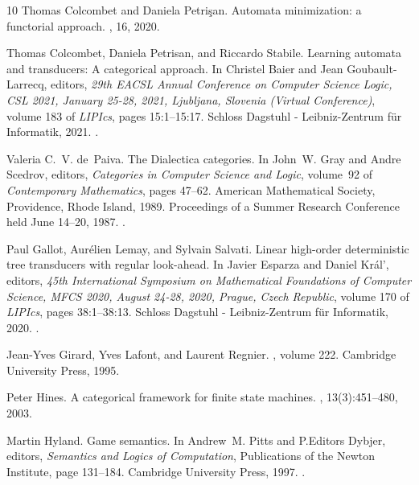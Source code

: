 \documentclass[10pt,a4paper]{amsart}
\numberwithin{equation}{section}
\theoremstyle{plain}
\begin{document}
\begin{thebibliography}{10}
Thomas Colcombet and Daniela Petri{\c{s}}an.
\newblock Automata minimization: a functorial approach.
, 16, 2020.

Thomas Colcombet, Daniela Petrisan, and Riccardo Stabile.
\newblock Learning automata and transducers: {A} categorical approach.
\newblock In Christel Baier and Jean Goubault{-}Larrecq, editors, {\em 29th
  {EACSL} Annual Conference on Computer Science Logic, {CSL} 2021, January
  25-28, 2021, Ljubljana, Slovenia (Virtual Conference)}, volume 183 of {\em
  LIPIcs}, pages 15:1--15:17. Schloss Dagstuhl - Leibniz-Zentrum f{\"{u}}r
  Informatik, 2021.
\newblock \href {https://doi.org/10.4230/LIPICS.CSL.2021.15}
  {}.

Valeria C.~V. de~Paiva.
\newblock The {Dialectica} categories.
\newblock In John~W. Gray and Andre Scedrov, editors, {\em Categories in
  Computer Science and Logic}, volume~92 of {\em Contemporary Mathematics},
  pages 47--62. American Mathematical Society, Providence, Rhode Island, 1989.
\newblock Proceedings of a Summer Research Conference held June 14--20, 1987.
\newblock \href {https://doi.org/10.1090/conm/092/1003194}
  {}.

Paul Gallot, Aurélien Lemay, and Sylvain Salvati.
\newblock Linear high-order deterministic tree transducers with regular
  look-ahead.
\newblock In Javier Esparza and Daniel Kr{\'{a}}l', editors, {\em 45th
  International Symposium on Mathematical Foundations of Computer Science,
  {MFCS} 2020, August 24-28, 2020, Prague, Czech Republic}, volume 170 of {\em
  LIPIcs}, pages 38:1--38:13. Schloss Dagstuhl - Leibniz-Zentrum für
  Informatik, 2020.
\newblock \href {https://doi.org/10.4230/LIPIcs.MFCS.2020.38}
  {}.

Jean-Yves Girard, Yves Lafont, and Laurent Regnier.
, volume 222.
\newblock Cambridge University Press, 1995.

Peter Hines.
\newblock A categorical framework for finite state machines.
, 13(3):451--480,
  2003.

Martin Hyland.
\newblock Game semantics.
\newblock In Andrew~M. Pitts and P.Editors Dybjer, editors, {\em Semantics and
  Logics of Computation}, Publications of the Newton Institute, page 131–184.
  Cambridge University Press, 1997.
\newblock \href {https://doi.org/10.1017/CBO9780511526619.005}
  {}.


\end{thebibliography}
\end{document}
